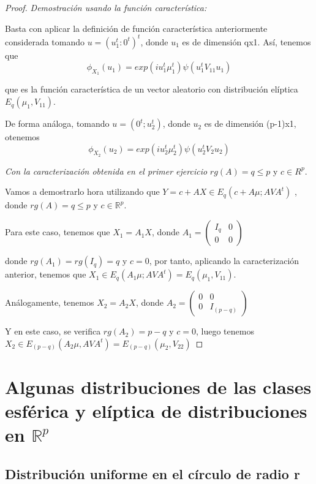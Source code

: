 \documentclass{article}
\theoremstyle{theorem-style}  %
\theoremstyle{definition}
\theoremstyle{example-style}
\begin{document}
		\begin{proof}
			
			\textit{Demostración usando la función característica: } 
			
			Basta con aplicar la definición de función característica anteriormente considerada tomando $u = (u_1^t: 0^t)^t$, donde $u_1$ es de dimensión qx1. Así, tenemos que
			\[
				\phi_{X_1}(u_1) = exp(i u_1^t \mu_1^t) \psi(u_1^t V_{11} u_1)
			\]
			
			que es la función característica de un vector aleatorio con distribución elíptica $E_q(\mu_1, V_{11})$.
			
			De forma análoga, tomando $u = (0^t; u_2^t)$, donde $u_2$ es de dimensión (p-1)x1, otenemos
			\[
							\phi_{X_2}(u_2) = exp(i u_2^t \mu_2^t) \psi(u_2^t V_{2} u_2)
			\]
			
			
			\textit{Con la caracterización obtenida en el primer ejercicio}
			$rg(A) = q \leq p$ y $c \in R^p$.
			

		Vamos a demostrarlo hora utilizando que $Y = c + AX \in E_q(c + A \mu; A V A^t)$ , donde  $rg(A) = q \leq p$ y $c \in \mathbb{R}^p$.
		
		Para este caso, tenemos que $X_1 = A_1 X$, donde $A_1 = \left( \begin{array}{cc}
		I_q & 0 \\ 0 & 0
		\end{array}\right)$

	
	  donde $rg(A_1) = rg(I_q) = q$ y $c = 0$, por tanto, aplicando la caracterización anterior, tenemos que $X_1 \in E_q(A_1 \mu; A V A^t) = E_q(\mu_1, V_{11})$.
	  
	  
	  Análogamente, tenemos $X_2 = A_2 X$, donde $A_2 = \left( \begin{array}{cc}
	  0 & 0 \\ 0 & I_{(p-q)}
	  \end{array}\right)$
	  
	  Y en este caso, se verifica $rg(A_2) = p-q$ y $c = 0$, luego tenemos $X_2 \in E_{(p-q)}(A_2 \mu, A V A^t) = E_{(p-q)}(\mu_2, V_{22})$
	
	\end{proof}
	\section{Algunas distribuciones de las clases esférica y elíptica de distribuciones en $\mathbb{R}^p$ }
	
	\subsection{Distribución uniforme en el círculo de radio r}
	
\end{document}
